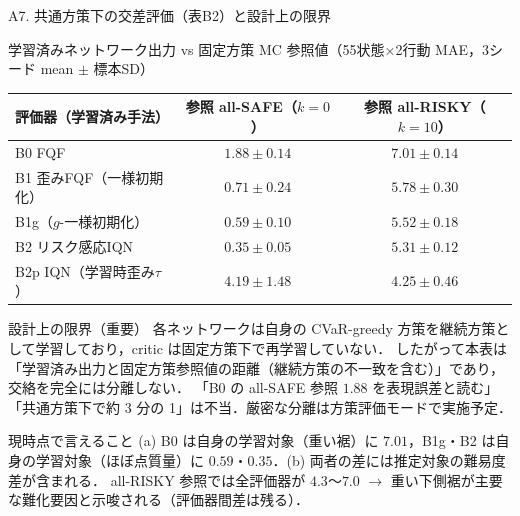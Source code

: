 \documentclass[aspectratio=169, 10pt]{beamer}
\newcommand{\blue}[1]{\textcolor{blue!80!black}{#1}}
\begin{document}
\begin{frame}{A7. 共通方策下の交差評価（表B2）と設計上の限界}
  \scriptsize
  \begin{block}{学習済みネットワーク出力 vs 固定方策 MC 参照値（55状態×2行動 MAE，3シード mean $\pm$ 標本SD）}
    \centering
    \setlength{\tabcolsep}{5pt}
    \begin{tabular}{@{}lcc@{}}
      \toprule
      評価器（学習済み手法） & 参照 all-SAFE（$k=0$） & 参照 all-RISKY（$k=10$） \\
      \midrule
      B0 FQF & $1.88\pm0.14$ & $7.01\pm0.14$ \\
      B1 歪みFQF（一様初期化） & $0.71\pm0.24$ & $5.78\pm0.30$ \\
      B1g（$g$-一様初期化） & $0.59\pm0.10$ & $5.52\pm0.18$ \\
      B2 リスク感応IQN & $\mathbf{0.35\pm0.05}$ & $5.31\pm0.12$ \\
      B2p IQN（学習時歪み$\tau$） & $4.19\pm1.48$ & $4.25\pm0.46$ \\
      \bottomrule
    \end{tabular}
  \end{block}
  \begin{alertblock}{設計上の限界（重要）}
    各ネットワークは\alert{自身の CVaR-greedy 方策}を継続方策として学習しており，critic は固定方策下で再学習していない．
    したがって本表は「学習済み出力と固定方策参照値の距離（\alert{継続方策の不一致を含む}）」であり，\alert{交絡を完全には分離しない}．
    「B0 の all-SAFE 参照 $1.88$ を表現誤差と読む」「共通方策下で約 3 分の 1」は\alert{不当}．厳密な分離は\blue{方策評価モード}で実施予定．
  \end{alertblock}
  \begin{exampleblock}{現時点で言えること}
    (a) B0 は自身の学習対象（重い裾）に $7.01$，B1g・B2 は自身の学習対象（ほぼ点質量）に $0.59$・$0.35$．(b) 両者の差には推定対象の難易度差が含まれる．
    all-RISKY 参照では全評価器が $4.3$〜$7.0$ $\to$ 重い下側裾が主要な難化要因と示唆される（評価器間差は残る）．
  \end{exampleblock}
\end{frame}
\end{document}
